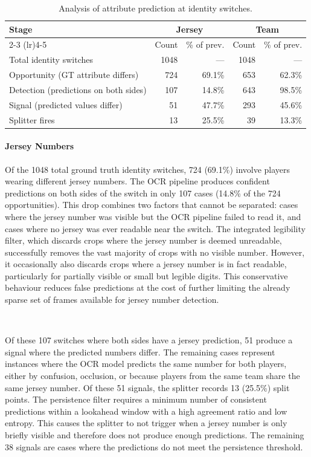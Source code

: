 \begin{table}[H]
\centering
\begin{tabular}{lrrrr}
\toprule
\textbf{Stage} & \multicolumn{2}{c}{\textbf{Jersey}} & \multicolumn{2}{c}{\textbf{Team}} \\
\cmidrule(lr){2-3} \cmidrule(lr){4-5}
 & Count & \% of prev. & Count & \% of prev. \\
\midrule
Total identity switches & 1048 & --- & 1048 & --- \\
Opportunity (GT attribute differs) & 724 & 69.1\% & 653 & 62.3\% \\
Detection (predictions on both sides) & 107 & 14.8\% & 643 & 98.5\% \\
Signal (predicted values differ) & 51 & 47.7\% & 293 & 45.6\% \\
Splitter fires & 13 & 25.5\% & 39 & 13.3\% \\
\bottomrule
\end{tabular}
\caption{Analysis of attribute prediction at identity switches.}
\label{tab:attribute_analysis}
\end{table}


\paragraph{Jersey Numbers}
Of the 1048 total ground truth identity switches, 724 (69.1\%) involve players wearing different jersey numbers. The OCR pipeline produces confident predictions on both sides of the switch in only 107 cases (14.8\% of the 724 opportunities). This drop combines two factors that cannot be separated: cases where the jersey number was visible but the OCR pipeline failed to read it, and cases where no jersey was ever readable near the switch. The integrated legibility filter, which discards crops where the jersey number is deemed unreadable, successfully removes the vast majority of crops with no visible number. However, it occasionally also discards crops where a jersey number is in fact readable, particularly for partially visible or small but legible digits. This conservative behaviour reduces false predictions at the cost of further limiting the already sparse set of frames available for jersey number detection.

\

Of these 107 switches where both sides have a jersey prediction, 51 produce a signal where the predicted numbers differ. The remaining cases represent instances where the OCR model predicts the same number for both players, either by confusion, occlusion, or because players from the same team share the same jersey number. Of these 51 signals, the splitter records 13 (25.5\%) split points. The persistence filter requires a minimum number of consistent predictions within a lookahead window with a high agreement ratio and low entropy. This causes the splitter to not trigger when a jersey number is only briefly visible and therefore does not produce enough predictions. The remaining 38 signals are cases where the predictions do not meet the persistence threshold.

